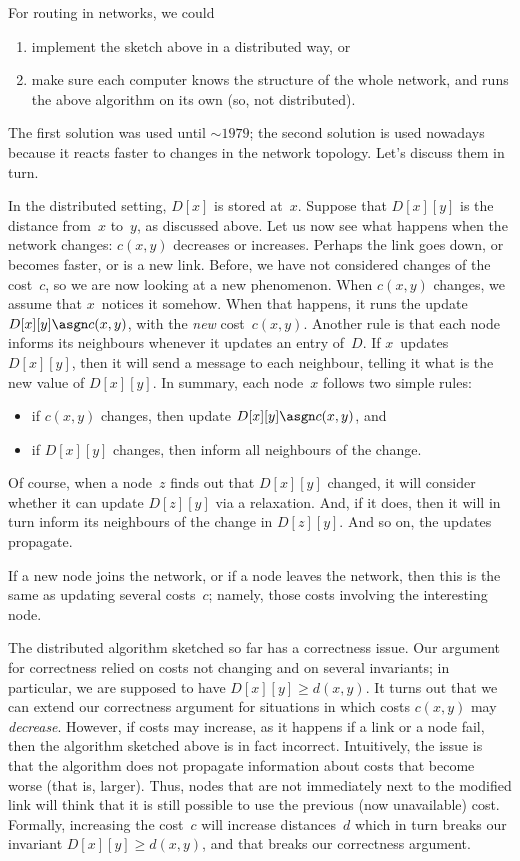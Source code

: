 For routing in networks, we could
\begin{enumerate}
\item implement the sketch above in a distributed way, or
\item make sure each computer knows the structure of the whole network,
  and runs the above algorithm on its own (so, not distributed).
\end{enumerate}
The first solution was used until $\sim1979$;
  the second solution is used nowadays
    because it reacts faster to changes in the network topology.
Let's discuss them in turn.

In the distributed setting, $D[x]$ is stored at~$x$.
Suppose that $D[x][y]$ is the distance from~$x$ to~$y$, as discussed above.
Let us now see what happens when the network changes:
  $c(x,y)$ decreases or increases.
Perhaps the link goes down, or becomes faster, or is a new link.
Before, we have not considered changes of the cost~$c$,
  so we are now looking at a new phenomenon.
When $c(x,y)$ changes, we assume that $x$~notices it somehow.
When that happens, it runs the update $D[x][y] \asgn c(x,y)$,
  with the \emph{new} cost~$c(x,y)$.
Another rule is that each node informs its neighbours whenever it updates
  an entry of~$D$.
If $x$~updates $D[x][y]$,
  then it will send a message to each neighbour,
  telling it what is the new value of $D[x][y]$.
In summary, each node~$x$ follows two simple rules:
\begin{itemize}
\item if $c(x,y)$ changes, then update $D[x][y] \asgn c(x,y)$, and
\item if $D[x][y]$ changes, then inform all neighbours of the change.
\end{itemize}
Of course, when a node~$z$ finds out that $D[x][y]$ changed,
  it will consider whether it can update $D[z][y]$ via a relaxation.
And, if it does, then it will in turn inform its neighbours
  of the change in $D[z][y]$.
And so on, the updates propagate.

If a new node joins the network, or if a node leaves the network,
  then this is the same as updating several costs~$c$;
  namely, those costs involving the interesting node.

The distributed algorithm sketched so far has a correctness issue.
Our argument for correctness relied on costs not changing and on several invariants;
  in particular, we are supposed to have $D[x][y] \ge d(x,y)$.
It turns out that we can extend our correctness argument for situations
  in which costs $c(x,y)$ may \emph{decrease}.
However,
  if costs may increase, as it happens if a link or a node fail,
  then the algorithm sketched above is in fact incorrect.
Intuitively,
  the issue is that the algorithm does not propagate information
  about costs that become worse (that is, larger).
Thus, nodes that are not immediately next to the modified link
  will think that it is still possible to use the previous (now unavailable) cost.
Formally,
  increasing the cost~$c$ will increase distances~$d$
  which in turn breaks our invariant $D[x][y] \ge d(x,y)$,
  and that breaks our correctness argument.

